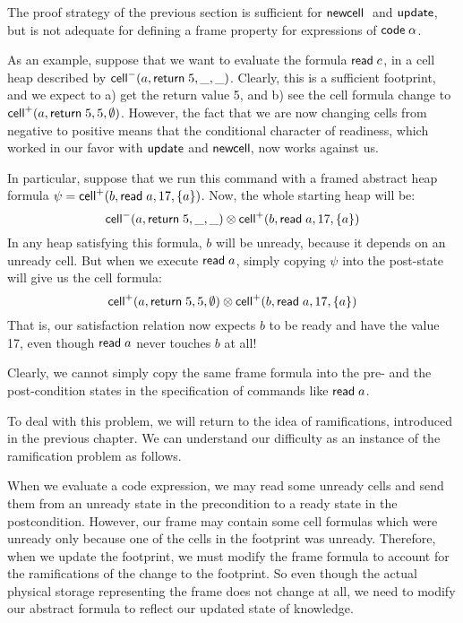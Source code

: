 The proof strategy of the previous section is sufficient for
$\mathsf{newcell}\;$ and $\mathsf{update}$, but is not adequate for defining a frame
property for expressions of $\mathsf{code}\;{\alpha}$.

As an example, suppose that we want to evaluate the formula $\mathsf{read}\;
c$, in a cell heap described by $\mathsf{cell}^{-}({a}, {\mathsf{return}\; 5}, {\_}, {\_})$.  Clearly,
this is a sufficient footprint, and we expect to a) get the return
value 5, and b) see the cell formula change to $\mathsf{cell}^{+}({a}, {\mathsf{return}\;
  5}, {5}, {\emptyset})$.  However, the fact that we are now changing cells
from negative to positive means that the conditional character of
readiness, which worked in our favor with $\mathsf{update}$ and
$\mathsf{newcell}\;\!\!$, now works against us.

In particular, suppose that we run this command with a framed abstract heap
formula $\psi = \mathsf{cell}^{+}({b}, {\mathsf{read}\; a}, {17}, {\{{a}\}})$. Now, the
whole starting heap will be:
\begin{displaymath}
\mathsf{cell}^{-}({a}, {\mathsf{return}\; 5}, {\_}, {\_}) \otimes \mathsf{cell}^{+}({b}, {\mathsf{read}\; a}, {17}, {\{{a}\}})  
\end{displaymath}
In any heap satisfying this formula, $b$ will be unready, because it depends 
on an unready cell. But when we execute $\mathsf{read}\; a$, simply copying $\psi$ 
into the post-state will give us the cell formula:
\begin{displaymath}
\mathsf{cell}^{+}({a}, {\mathsf{return}\; 5}, {5}, {\emptyset}) \otimes \mathsf{cell}^{+}({b}, {\mathsf{read}\; a}, {17}, {\{{a}\}})
\end{displaymath}
That is, our satisfaction relation now expects $b$ to be ready and have the 
value 17, even though $\mathsf{read}\; a$ never touches $b$ at all!

Clearly, we cannot simply copy the same frame formula into the pre-
and the post-condition states in the specification of commands like
$\mathsf{read}\; a$.

To deal with this problem, we will return to the idea of
ramifications, introduced in the previous chapter. We can understand
our difficulty as an instance of the ramification problem as
follows. 

When we evaluate a code expression, we may read some unready cells and
send them from an unready state in the precondition to a ready state
in the postcondition. However, our frame may contain some cell
formulas which were unready only because one of the cells in the
footprint was unready. Therefore, when we update the footprint, we
must modify the frame formula to account for the ramifications of the
change to the footprint. So even though the actual physical storage
representing the frame does not change at all, we need to modify our
abstract formula to reflect our updated state of knowledge.

